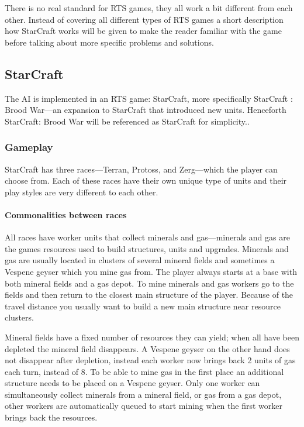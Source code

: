 There is no real standard for RTS games, they all work a bit different from each other. Instead of covering all different types of RTS games a short description how StarCraft works will be given to make the reader familiar with the game before talking about more specific problems and solutions.

\subsection{StarCraft}
The AI is implemented in an RTS game: StarCraft, more specifically StarCraft : Brood War—an expansion to StarCraft that introduced new units. Henceforth StarCraft: Brood War will be referenced as StarCraft for simplicity..


\subsubsection{Gameplay}
StarCraft has three races—Terran, Protoss, and Zerg—which the player can choose from. Each of these races have their own unique type of units and their play styles are very different to each other.

\paragraph{Commonalities between races}
All races have worker units that collect minerals and gas—minerals and gas are the games resources used to build structures, units and upgrades. Minerals and gas are usually located in clusters of several mineral fields and sometimes a Vespene geyser which you mine gas from. The player always starts at a base with both mineral fields and a gas depot. To mine minerals and gas workers go to the fields and then return to the closest main structure of the player. Because of the travel distance you usually want to build a new main structure near resource clusters.

Mineral fields have a fixed number of resources they can yield; when all have been depleted the mineral field disappears. A Vespene geyser on the other hand does not disappear after depletion, instead each worker now brings back 2 units of gas each turn, instead of 8. To be able to mine gas in the first place an additional structure needs to be placed on a Vespene geyser. Only one worker can simultaneously collect minerals from a mineral field, or gas from a gas depot, other workers are automatically queued to start mining when the first worker brings back the resources.

